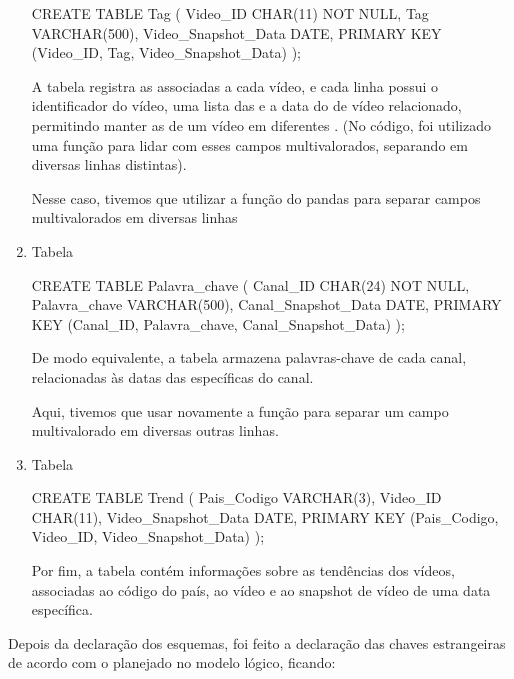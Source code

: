 \begin{enumerate}
  \begin{code}
    CREATE TABLE Tag (
      Video_ID CHAR(11) NOT NULL,
      Tag VARCHAR(500),
      Video_Snapshot_Data DATE,
      PRIMARY KEY (Video_ID, Tag, Video_Snapshot_Data)
    );
  \end{code}

  A tabela  registra as  associadas a cada vídeo, e cada linha possui o identificador do vídeo, uma lista das  e a data do  de vídeo relacionado, permitindo manter as  de um vídeo em diferentes . (No código, foi utilizado uma função para lidar com esses campos multivalorados, separando em diversas linhas distintas).

  Nesse caso, tivemos que utilizar a função  do pandas para separar campos multivalorados em diversas linhas

  \item Tabela 

  \begin{code}
    CREATE TABLE Palavra_chave (
      Canal_ID CHAR(24) NOT NULL,
      Palavra_chave VARCHAR(500),
      Canal_Snapshot_Data DATE,
      PRIMARY KEY (Canal_ID, Palavra_chave, Canal_Snapshot_Data)
    );
  \end{code}

  De modo equivalente, a tabela  armazena palavras-chave de cada canal, relacionadas às datas das  específicas do canal.

  Aqui, tivemos que usar novamente a função para separar um campo multivalorado em diversas outras linhas.

  \item Tabela 

  \begin{code}
    CREATE TABLE Trend (
      Pais_Codigo VARCHAR(3),
      Video_ID CHAR(11),
      Video_Snapshot_Data DATE,
      PRIMARY KEY (Pais_Codigo, Video_ID, Video_Snapshot_Data)
    );
  \end{code}

  Por fim, a tabela  contém informações sobre as tendências dos vídeos, associadas ao código do país, ao vídeo e ao snapshot de vídeo de uma data específica.
\end{enumerate}

Depois da declaração dos esquemas, foi feito a declaração das chaves estrangeiras de acordo com o planejado no modelo lógico, ficando:

